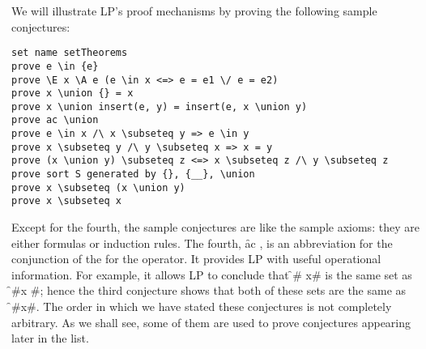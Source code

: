 
We will illustrate LP's proof mechanisms by proving the following sample
conjectures:
\begin{verbatim}
set name setTheorems
prove e \in {e}
prove \E x \A e (e \in x <=> e = e1 \/ e = e2)
prove x \union {} = x
prove x \union insert(e, y) = insert(e, x \union y)
prove ac \union
prove e \in x /\ x \subseteq y => e \in y
prove x \subseteq y /\ y \subseteq x => x = y
prove (x \union y) \subseteq z <=> x \subseteq z /\ y \subseteq z
prove sort S generated by {}, {__}, \union
prove x \subseteq (x \union y)
prove x \subseteq x
\end{verbatim}
Except for the fourth, the sample conjectures are like the sample axioms: they
are either formulas or induction rules.  The fourth, \f{ac \union}, is an
abbreviation for the conjunction of the 
 for the \fq{\union} 
operator.  It provides LP with useful operational information.  For example, it
allows LP to conclude that \f#{} \union x# is the same set as \f#x \union {}#;
hence the third conjecture shows that both of these sets are the same as \f#x#.
\p
The order in which we have stated these conjectures is not completely
arbitrary.  As we shall see, some of them are used to prove conjectures
appearing later in the list.
